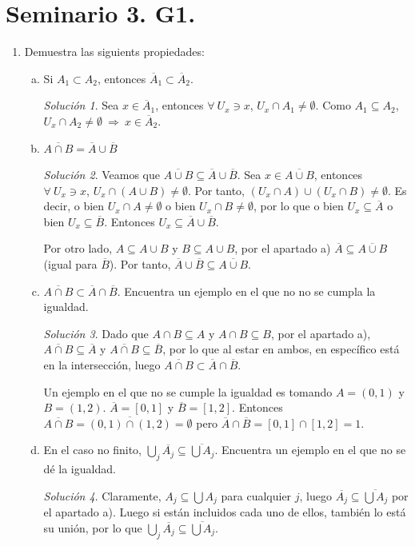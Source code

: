 \documentclass[12pt,twoside]{report}
\theoremstyle{azul}
\theoremstyle{azul2}
\theoremstyle{plain}
\theoremstyle{definition}
\theoremstyle{remark}
\newtheorem*{sol}{Solución}
\begin{document}
\section{Seminario 3. G1.}
\begin{enumerate}
    \item Demuestra las siguients propiedades:
\begin{enumerate}[a)]
    \item Si $A_1 \subset A_2$, entonces $\overline{A}_1 \subset \overline{A}_2$. 
    \begin{sol}
    Sea $x \in \overline{A}_1$, entonces $\forall \: U_x \ni x$, $U_x \cap A_1 \neq \emptyset$. Como $A_1 \subseteq A_2$, \\ $U_x \cap A_2 \neq \emptyset \: \Rightarrow \: x \in \overline{A}_2$.
    \end{sol}
    \item $\overline{A \cap B}= \overline{A} \cup \overline{B} $
    \begin{sol}
    Veamos que $\overline{A \cup B} \subseteq \overline{A} \cup \overline{B}$. Sea $x \in \overline{A \cup B}$, entonces $\forall \: U_x \ni x$, $U_x \cap (A \cup B) \neq \emptyset$. Por tanto, $(U_x \cap A) \cup (U_x \cap B) \neq \emptyset$. Es decir, o bien $U_x \cap A \neq \emptyset$ o bien $U_x \cap B \neq \emptyset$, por lo que o bien $U_x \subseteq \overline{A}$ o bien $U_x \subseteq \overline{B}$. Entonces $U_x \subseteq \overline{A} \cup \overline{B}$.
    
    Por otro lado, $A \subseteq A \cup B$ y $B \subseteq A \cup B$, por el apartado  a) $\overline{A} \subseteq \overline{A \cup B}$ (igual para $\overline{B}$). Por tanto, $\overline{A} \cup \overline{B} \subseteq \overline{A \cup B}$. 
    \end{sol}
    \item $\overline{A \cap B} \subset \overline{A} \cap \overline{B}$. Encuentra un ejemplo en el que no no se cumpla la igualdad.
    \begin{sol}
    Dado que $A \cap B \subseteq A$ y $A \cap B \subseteq B$, por el apartado a), $\overline{A \cap B} \subseteq \overline{A}$ y $\overline{A \cap B} \subseteq \overline{B}$, por lo que al estar en ambos, en específico está en la intersección, luego $\overline{A \cap B} \subset \overline{A} \cap \overline{B}$. 
    
    Un ejemplo en el que no se cumple la igualdad es tomando $A=(0,1)$ y $B=(1,2)$. $\overline{A}=[0,1]$ y $\overline{B}=[1,2]$. Entonces $\overline{A \cap B}=\overline{(0,1) \cap (1,2)}=\emptyset$ pero $\overline{A} \cap \overline{B}=[0,1]\cap [1,2]=1$.
    \end{sol}
    \item En el caso no finito, $\bigcup_j \overline{A_j} \subseteq \overline{\bigcup A_j}$. Encuentra un ejemplo en el que no se dé la igualdad. 
    \begin{sol}
    Claramente, $A_j \subseteq \bigcup A_j$ para cualquier $j$, luego $\overline{A_j} \subseteq \overline{\bigcup A_j}$ por el apartado a). Luego si están incluidos cada uno de ellos, también lo está su unión, por lo que  $\bigcup_j \overline{A_j} \subseteq \overline{\bigcup A_j}$.
    

\end{sol}
\end{enumerate}
\end{enumerate}
\end{document}
